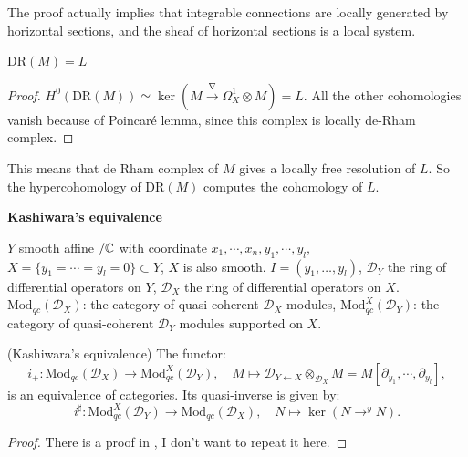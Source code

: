 \begin{rk}
  The proof actually implies that integrable connections are locally generated by horizontal sections, and the sheaf of horizontal sections is a local system.
\end{rk}

\begin{cor}
  $\mathrm{DR}(M) = L $
\end{cor}

\begin{proof}
  $H^0(\mathrm{DR}(M)) \simeq \ker(M \xrightarrow{\nabla} \Omega^1_X \otimes M) = L$. All the other cohomologies vanish because of Poincar\'e  lemma, since this complex is locally de-Rham complex.
\end{proof}

\begin{rk}
  This means that de Rham complex of $M$ gives a locally free resolution of $L$. So the hypercohomology of $\mathrm{DR}(M)$ computes the cohomology of $L$.
\end{rk}





\textbf{Kashiwara's equivalence }

$Y$ smooth affine $/ \mathbb{C}$  with coordinate $x_1,\cdots,x_n,y_1,\cdots,y_l$, $X = \{y_1 = \cdots = y_l = 0\} \subset Y$, $X$ is also smooth. $I = (y_1,\ldots,y_l)$, $\mathcal{D}_Y$ the ring of differential operators on $Y$, $\mathcal{D}_X$ the ring of differential operators on $X$. $\mathrm{Mod}_{qc}(\mathcal{D}_X)$: the category of quasi-coherent $\mathcal{D}_X$ modules, $\mathrm{Mod}^X_{qc}(\mathcal{D}_Y)$: the category of quasi-coherent $\mathcal{D}_Y$ modules supported on $X$.

\begin{thm}
  (Kashiwara's equivalence) The functor:
  \[
    i_+ : \mathrm{Mod}_{qc}(\mathcal{D}_X) \to \mathrm{Mod}^X_{qc}(\mathcal{D}_Y), \quad M \mapsto \mathcal{D}_{Y \leftarrow X} \otimes_{\mathcal{D}_X} M = M[\partial_{y_1},\cdots,\partial_{y_l}],
  \]
  is an equivalence of categories. Its quasi-inverse is given by:
  \[
    i^{\sharp} : \mathrm{Mod}^X_{qc}(\mathcal{D}_Y) \to \mathrm{Mod}_{qc}(\mathcal{D}_X), \quad N \mapsto \ker(N \longrightarrow^{y} N).
  \]
\end{thm}

\begin{proof}
  There is a proof in \cite{HTT08}, I don't want to repeat it here.
\end{proof}

